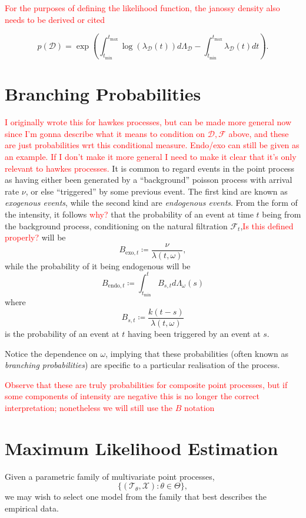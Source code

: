 \documentclass[honours,12pt]{unswthesis}
\numberwithin{equation}{section}
\begin{document}
\textcolor{red}{For the purposes of defining the likelihood function, the janossy density also needs to be derived or cited}

$$p(\mathcal{D}) = \exp\left(\int_{t_\mathrm{min}}^{t_\mathrm{max}}\log(\lambda_\mathcal{D}(t))d\Lambda_\mathcal{D}-\int_{t_\mathrm{min}}^{t_\mathrm{max}}\lambda_\mathcal{D}(t) dt\right).$$

\section{Branching Probabilities}
\textcolor{red}{I originally wrote this for hawkes processes, but can be made more general now since I'm gonna describe what it means to condition on $\mathcal{D},\mathcal{F}$ above, and these are just probabilities wrt this conditional measure. Endo/exo can still be given as an example. If I don't make it more general I need to make it clear that it's only relevant to hawkes processes.}
It is common to regard events in the point process as having either been generated by a ``background'' poisson process with arrival rate $\nu$, or else ``triggered'' by some previous event. The first kind are known as \textit{exogenous events}, while the second kind are \textit{endogenous events}. From the form of the intensity, it follows \textcolor{red}{why?} that the probability of an event at time $t$ being from the background process, conditioning on the natural filtration $\mathcal{F}_t$,\textcolor{red}{Is this defined properly?} will be
$$B_{\mathrm{exo},t}\coloneq \frac{\nu}{\lambda(t,\omega)},$$
while the probability of it being endogenous will be
$$B_{\mathrm{endo},t}\coloneq \int_{t_\mathrm{min}}^t B_{s,t}d\Lambda_\omega(s)$$
where
$$B_{s,t} \coloneq \frac{k(t-s)}{\lambda(t,\omega)}$$
is the probability of an event at $t$ having been triggered by an event at $s$.

Notice the dependence on $\omega$, implying that these probabilities (often known as \textit{branching probabilities}) are specific to a particular realisation of the process.

\textcolor{red}{Observe that these are truly probabilities for composite point processes, but if some components of intensity are negative this is no longer the correct interpretation; nonetheless we will still use the $B$ notation}
\section{Maximum Likelihood Estimation}
Given a parametric family of multivariate point processes,
$$\{(\mathcal{T}_\theta,\mathcal{X}) : \theta\in\Theta\},$$
we may wish to select one model from the family that best describes the empirical data.
\end{document}
